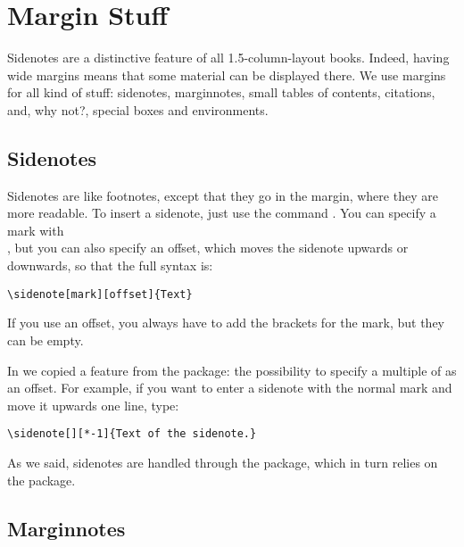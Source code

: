 \chapter{Margin Stuff}

Sidenotes are a distinctive feature of all 1.5-column-layout books. 
Indeed, having wide margins means that some material can be displayed 
there. We use margins for all kind of stuff: sidenotes, marginnotes, 
small tables of contents, citations, and, why not?, special boxes and 
environments.

\section{Sidenotes}

Sidenotes are like footnotes, except that they go in the margin, where 
they are more readable. To insert a sidenote, just use the command 
. You can specify a 
mark with \\ 
, but you can also specify an offset, 
which moves the sidenote upwards or downwards, so that the full syntax is:

\begin{lstlisting}
\sidenote[mark][offset]{Text}
\end{lstlisting}

If you use an offset, you always have to add the brackets for the mark, 
but they can be empty.

In  we copied a feature from the  
package: the possibility to specify a multiple of  
as an offset. For example, if you want to enter a sidenote with the 
normal mark and move it upwards one line, type:

\begin{lstlisting}
\sidenote[][*-1]{Text of the sidenote.}
\end{lstlisting}

As we said, sidenotes are handled through the  
package, which in turn relies on the  package.

\section{Marginnotes}

